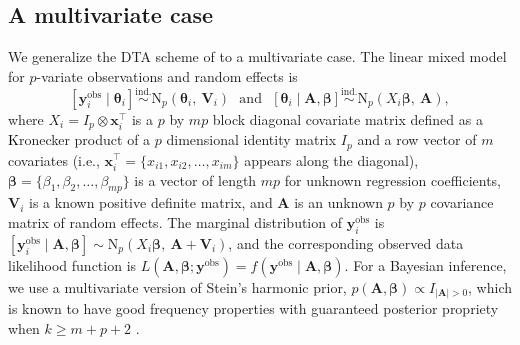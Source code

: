 \documentclass[12pt]{article}
\begin{document}
\subsection{A multivariate case}\label{sec32}



We generalize the DTA scheme of \cite{kelly2014advances} to a multivariate case. The linear mixed model for $p$-variate observations and random effects \citep{everson2000inference, gasparrini2012mlmm}  is
\begin{equation}\label{mlmm}
[\boldsymbol{y}_i^{\textrm{obs}}\mid \boldsymbol{\theta}_i]  \stackrel{\textrm{ind.}}{\sim} \textrm{N}_p(\boldsymbol{\theta}_i,~ \boldsymbol{V}\!_i)~~~\textrm{and}~~~[\boldsymbol{\theta}_i\mid \boldsymbol{A}, \boldsymbol{\beta}] \stackrel{\textrm{ind.}}{\sim}  \textrm{N}_p(X_i \boldsymbol{\beta},~ \boldsymbol{A}),
\end{equation}
where $X_i=I_p \otimes \boldsymbol{x}_i^{\top}$ is a $p$ by $mp$ block diagonal covariate matrix defined as a \textcolor{black}{K}ronecker product of a $p$ dimensional identity matrix $I_p$  and a row vector of $m$ covariates (i.e., $\boldsymbol{x}_i^{\top}=\{x_{i1}, x_{i2}, \ldots, x_{im}\}$ appears along the diagonal), $\boldsymbol{\beta}=\{\beta_1, \beta_2, \ldots, \beta_{mp}\}$ is a vector of length $mp$  for unknown regression coefficients, $\boldsymbol{V}\!_i$ is a known positive definite matrix, and $\boldsymbol{A}$ is an unknown $p$ by $p$ covariance matrix of random effects. The marginal distribution of $\boldsymbol{y}_i^{\textrm{obs}}$  is $[\boldsymbol{y}_i^{\textrm{obs}}\mid \boldsymbol{A}, \boldsymbol{\beta}]\sim \textrm{N}_p(X_i \boldsymbol{\beta},~ \boldsymbol{A}+\boldsymbol{V}\!_i)$,  and the corresponding observed data likelihood function is $L(\boldsymbol{A}, \boldsymbol{\beta}; \boldsymbol{y}^{\textrm{obs}})=f(\boldsymbol{y}^{\textrm{obs}}\mid \boldsymbol{A}, \boldsymbol{\beta})$. For a Bayesian inference, we use a multivariate version of Stein's harmonic prior, $p(\boldsymbol{A}, \boldsymbol{\beta})\propto I_{\mid \boldsymbol{A}\mid>0}$, which is known to have good frequency properties with guaranteed posterior propriety when $k\ge m+p+2$ \citep{everson2000inference, tak2017frequency}. 
\end{document}
